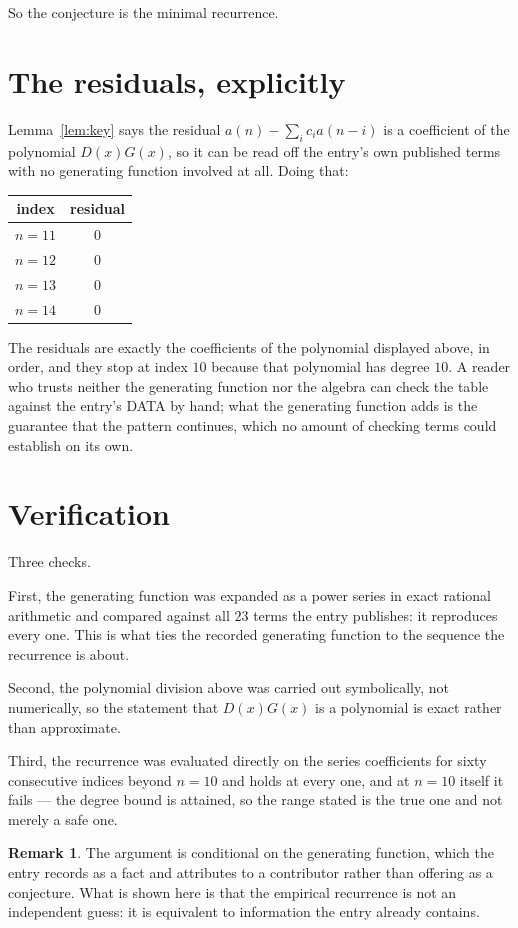 \documentclass[11pt,a4paper]{article}
\theoremstyle{plain}
\theoremstyle{definition}
\newtheorem{remark}[theorem]{Remark}
\begin{document}
So the conjecture is the minimal recurrence.

\section{The residuals, explicitly}

Lemma~\ref{lem:key} says the residual $a(n)-\sum_ic_ia(n-i)$ is a coefficient of the
polynomial $D(x)G(x)$, so it can be read off the entry's own published terms with no
generating function involved at all. Doing that:
\begin{center}
\begin{tabular}{cc}
index & residual \\ \hline
$n=11$ & $0$ \\
$n=12$ & $0$ \\
$n=13$ & $0$ \\
$n=14$ & $0$
\end{tabular}
\end{center}
The residuals are exactly the coefficients of the polynomial displayed above, in order, and
they stop at index $10$ because that polynomial has degree $10$. A reader who trusts
neither the generating function nor the algebra can check the table against the entry's DATA
by hand; what the generating function adds is the guarantee that the pattern continues, which
no amount of checking terms could establish on its own.

\section{Verification}

Three checks.

First, the generating function was expanded as a power series in exact rational arithmetic and
compared against all $23$ terms the entry publishes: it reproduces every one. This is
what ties the recorded generating function to the sequence the recurrence is about.

Second, the polynomial division above was carried out symbolically, not numerically, so the
statement that $D(x)G(x)$ is a polynomial is exact rather than approximate.

Third, the recurrence was evaluated directly on the series coefficients for sixty consecutive
indices beyond $n=10$ and holds at every one, and at $n=10$ itself it fails --- the
degree bound is attained, so the range stated is the true one and not merely a safe one.

\begin{remark}
The argument is conditional on the generating function, which the entry records as a fact and
attributes to a contributor rather than offering as a conjecture. What is shown here is that
the empirical recurrence is not an independent guess: it is equivalent to information the
entry already contains.
\end{remark}
\end{document}
